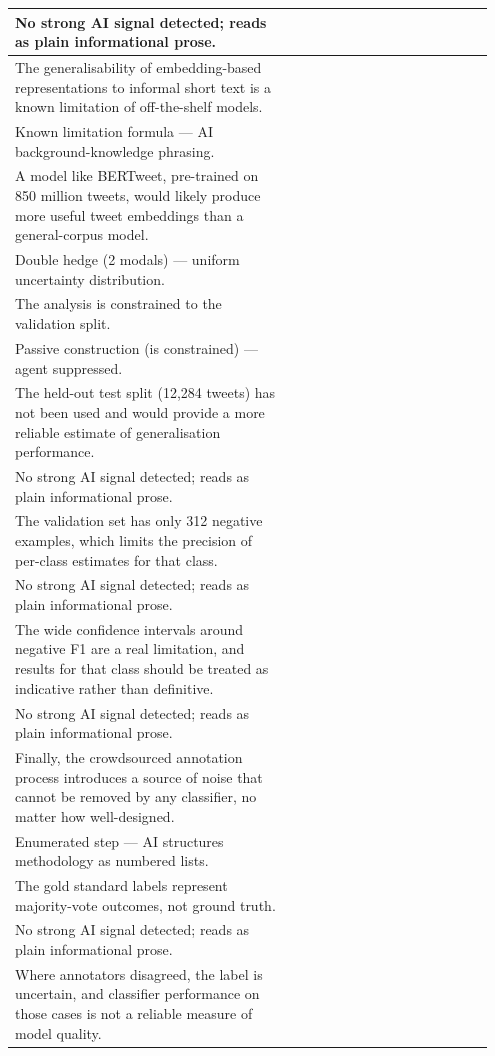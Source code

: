 \documentclass[11pt]{article}
\begin{document}
\begin{longtable}{|p{0.55\linewidth}|p{0.40\linewidth}|}
No strong AI signal detected; reads as plain informational prose. & \\
\hline
The generalisability of embedding-based representations to informal short text is a known limitation of off-the-shelf models. & \\[2pt]
\hline
Known limitation formula --- AI background-knowledge phrasing. & \\
\hline
A model like BERTweet, pre-trained on 850 million tweets, would likely produce more useful tweet embeddings than a general-corpus model. & \\[2pt]
\hline
Double hedge (2 modals) --- uniform uncertainty distribution. & \\
\hline
The analysis is constrained to the validation split. & \\[2pt]
\hline
Passive construction (is constrained) --- agent suppressed. & \\
\hline
The held-out test split (12,284 tweets) has not been used and would provide a more reliable estimate of generalisation performance. & \\[2pt]
\hline
No strong AI signal detected; reads as plain informational prose. & \\
\hline
The validation set has only 312 negative examples, which limits the precision of per-class estimates for that class. & \\[2pt]
\hline
No strong AI signal detected; reads as plain informational prose. & \\
\hline
The wide confidence intervals around negative F1 are a real limitation, and results for that class should be treated as indicative rather than definitive. & \\[2pt]
\hline
No strong AI signal detected; reads as plain informational prose. & \\
\hline
Finally, the crowdsourced annotation process introduces a source of noise that cannot be removed by any classifier, no matter how well-designed. & \\[2pt]
\hline
Enumerated step --- AI structures methodology as numbered lists. & \\
\hline
The gold standard labels represent majority-vote outcomes, not ground truth. & \\[2pt]
\hline
No strong AI signal detected; reads as plain informational prose. & \\
\hline
Where annotators disagreed, the label is uncertain, and classifier performance on those cases is not a reliable measure of model quality. & \\[2pt]

\end{longtable}
\end{document}
